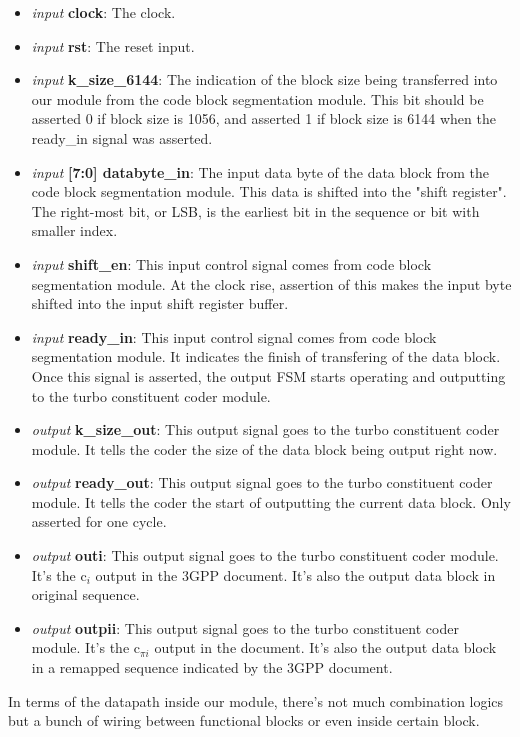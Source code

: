 \documentclass[letterpaper]{article} %
\begin{document}
\begin{itemize}
    \item {\it input} {\bf clock}: The clock.
    \item {\it input} {\bf rst}: The reset input.
    \item {\it input} {\bf k\_size\_6144}: The indication of the block size being transferred into our module from the code block segmentation module. This bit should be asserted 0 if block size is 1056, and asserted 1 if block size is 6144 when the ready\_in signal was asserted.
    \item {\it input} {\bf [7:0] databyte\_in}: The input data byte of the data block from the code block segmentation module. This data is shifted into the "shift register". The right-most bit, or LSB, is the earliest bit in the sequence or bit with smaller index.
    \item {\it input} {\bf shift\_en}: This input control signal comes from code block segmentation module. At the clock rise, assertion of this makes the input byte shifted into the input shift register buffer.
    \item {\it input} {\bf ready\_in}: This input control signal comes from code block segmentation module. It indicates the finish of transfering of the data block. Once this signal is asserted, the output FSM starts operating and outputting to the turbo constituent coder module.
    \item {\it output} {\bf k\_size\_out}: This output signal goes to the turbo constituent coder module. It tells the coder the size of the data block being output right now.
    \item {\it output} {\bf ready\_out}: This output signal goes to the turbo constituent coder module. It tells the coder the start of outputting the current data block. Only asserted for one cycle. 
    \item {\it output} {\bf outi}: This output signal goes to the turbo constituent coder module. It's the c$_i$ output in the 3GPP document. It's also the output data block in original sequence.
    \item {\it output} {\bf outpii}: This output signal goes to the turbo constituent coder module. It's the c$_{\pi i}$ output in the document. It's also the output data block in a remapped sequence indicated by the 3GPP document.
\end{itemize}

In terms of the datapath inside our module, there's not much combination logics but a bunch of wiring between functional blocks or even inside certain block. 
\end{document}
